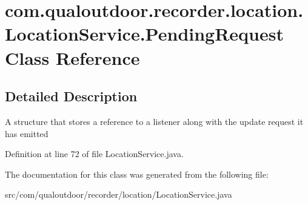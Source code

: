 \hypertarget{classcom_1_1qualoutdoor_1_1recorder_1_1location_1_1LocationService_1_1PendingRequest}{\section{com.\-qualoutdoor.\-recorder.\-location.\-Location\-Service.\-Pending\-Request Class Reference}
\label{classcom_1_1qualoutdoor_1_1recorder_1_1location_1_1LocationService_1_1PendingRequest}
}


\subsection{Detailed Description}
A structure that stores a reference to a listener along with the update request it has emitted 

Definition at line 72 of file Location\-Service.\-java.



The documentation for this class was generated from the following file\-:\begin{DoxyCompactItemize}
\item 
src/com/qualoutdoor/recorder/location/Location\-Service.\-java\end{DoxyCompactItemize}
